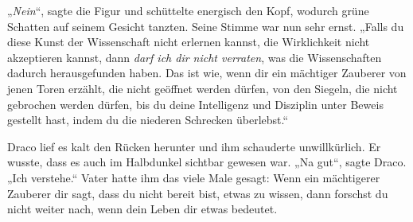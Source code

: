 „\emph{Nein}“, sagte die Figur und schüttelte energisch den Kopf, wodurch grüne Schatten auf seinem Gesicht tanzten. Seine Stimme war nun sehr ernst.
„Falls du diese Kunst der Wissenschaft nicht erlernen kannst, die Wirklichkeit nicht akzeptieren kannst, dann \emph{darf ich dir nicht verraten}, was die Wissenschaften dadurch herausgefunden haben. Das ist wie, wenn dir ein mächtiger Zauberer von jenen Toren erzählt, die nicht geöffnet werden dürfen, von den Siegeln, die nicht gebrochen werden dürfen, bis du deine Intelligenz und Disziplin unter Beweis gestellt hast, indem du die niederen Schrecken überlebst.“

Draco lief es kalt den Rücken herunter und ihm schauderte unwillkürlich. Er wusste, dass es auch im Halbdunkel sichtbar gewesen war.
„Na gut“, sagte Draco.
„Ich verstehe.“ Vater hatte ihm das viele Male gesagt: Wenn ein mächtigerer Zauberer dir sagt, dass du nicht bereit bist, etwas zu wissen, dann forschst du nicht weiter nach, wenn dein Leben dir etwas bedeutet.

